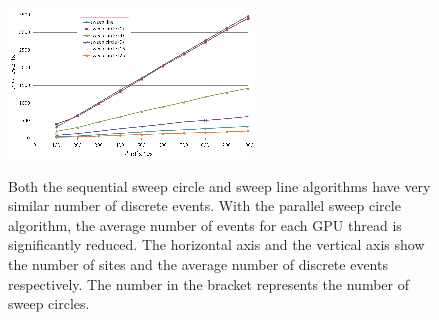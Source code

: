 {{\begin{figure}[!htbp]
\vspace{-3mm}
\begin{center}
\includegraphics[width=0.95\columnwidth]{figs/sweepcircle/num_of_events.png}\\
\end{center}
\vspace{-0.1in}\caption{Both the sequential sweep circle and sweep
line algorithms have very similar number of discrete events. With
the parallel sweep circle algorithm, the average number of events
for each GPU thread is significantly reduced. The horizontal axis
and the vertical axis show the number of sites and the average
number of discrete events respectively. The number in the bracket
represents the number of sweep circles.} \label{fig:events}
\vspace{-3mm}
\end{figure}


}}
